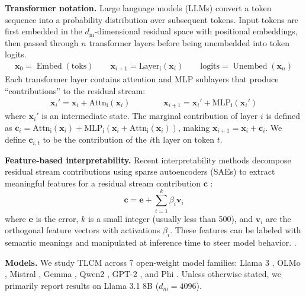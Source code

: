 
\textbf{Transformer notation.} Large language models (LLMs) convert a token sequence into a probability distribution over subsequent tokens. Input tokens are first embedded in the $d_\text{m}$-dimensional residual space with positional embeddings, then passed through $n$ transformer layers before being unembedded into token logits.
\begin{align*}
    \mathbf{x}_0 = \operatorname{Embed}(\text{toks}) \qquad
    \mathbf{x}_{i+1} = \operatorname{Layer_i}(\mathbf{x}_i) \qquad
    \text{logits} = \operatorname{Unembed}(\mathbf{x}_n)
\end{align*}
Each transformer layer contains attention and MLP sublayers that produce ``contributions'' to the residual stream:
\begin{align*}
    \mathbf{x}_i' = \mathbf{x}_i + \operatorname{Attn_i}(\mathbf{x}_i) \qquad \qquad
    \mathbf{x}_{i+1} = \mathbf{x}_i' + \operatorname{MLP_i}(\mathbf{x}_i')
\end{align*}
where $\mathbf{x}_i'$ is an intermediate state. The marginal contribution of layer $i$ is defined as $\mathbf{c}_i = \operatorname{Attn_i}(\mathbf{x}_i) + \operatorname{MLP_i}(\mathbf{x}_i + \operatorname{Attn_i}(\mathbf{x}_i))$, making $\mathbf{x}_{i+1} = \mathbf{x}_i + \mathbf{c}_i \label{eq:contribution}$. We define $\mathbf{c}_{i,t}$ to be the contribution of the $i$th layer on token $t$.

\textbf{Feature-based interpretability.} Recent interpretability methods decompose residual stream contributions using sparse autoencoders (SAEs) to extract meaningful features for a residual stream contribution $\mathbf{c}$ \cite{cunningham2023sparseautoencodershighlyinterpretable, gao2024scalingevaluatingsparseautoencoders, templeton2024scaling}:
$$\mathbf{c} = \mathbf{e} + \sum_{i=1}^k \beta_i \mathbf{v}_i$$
where $\mathbf{e}$ is the error, $k$ is a small integer (usually less than 500), and $\mathbf{v}_i$ are the orthogonal feature vectors with activations $\beta_i$. These features can be labeled with semantic meanings and manipulated at inference time to steer model behavior. \cite{marks2025sparsefeaturecircuitsdiscovering, templeton2024scaling, chalnev2024improvingsteeringvectorstargeting}.

\textbf{Models.} We study TLCM across 7 open-weight model families: Llama 3 \cite{grattafiori2024llama3herdmodels}, OLMo \cite{groeneveld2024olmoacceleratingsciencelanguage}, Mistral \cite{jiang2023mistral7b, jiang2024mixtralexperts}, Gemma \cite{gemmateam2024gemmaopenmodelsbased, gemmateam2024gemma2improvingopen}, Qwen2 \cite{yang2024qwen2technicalreport}, GPT-2 \cite{radford2019language}, and Phi \cite{abdin2024phi3technicalreporthighly, abdin2024phi4technicalreport}. Unless otherwise stated, we primarily report results on Llama 3.1 8B ($d_m = 4096$).
